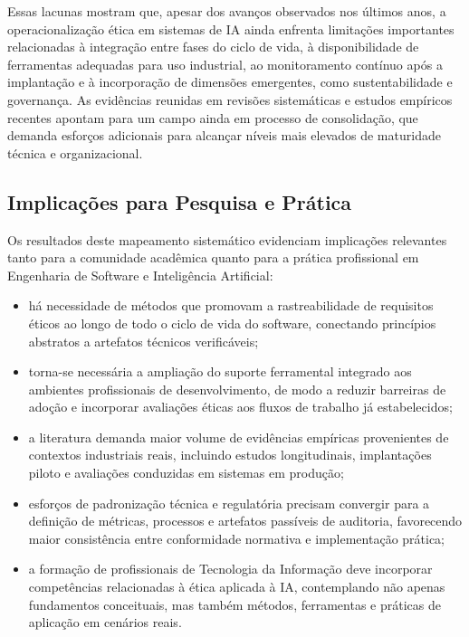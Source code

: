 Essas lacunas mostram que, apesar dos avanços observados nos últimos anos, a operacionalização ética em sistemas de IA ainda enfrenta limitações importantes relacionadas à integração entre fases do ciclo de vida, à disponibilidade de ferramentas adequadas para uso industrial, ao monitoramento contínuo após a implantação e à incorporação de dimensões emergentes, como sustentabilidade e governança. As evidências reunidas em revisões sistemáticas e estudos empíricos recentes \cite{S022, S058, S053} apontam para um campo ainda em processo de consolidação, que demanda esforços adicionais para alcançar níveis mais elevados de maturidade técnica e organizacional.

\subsection{Implicações para Pesquisa e Prática}

Os resultados deste mapeamento sistemático evidenciam implicações relevantes tanto para a comunidade acadêmica quanto para a prática profissional em Engenharia de Software e Inteligência Artificial:

\begin{itemize}
    \item há necessidade de métodos que promovam a rastreabilidade de requisitos éticos ao longo de todo o ciclo de vida do software, conectando princípios abstratos a artefatos técnicos verificáveis;
    \item torna-se necessária a ampliação do suporte ferramental integrado aos ambientes profissionais de desenvolvimento, de modo a reduzir barreiras de adoção e incorporar avaliações éticas aos fluxos de trabalho já estabelecidos;
    \item a literatura demanda maior volume de evidências empíricas provenientes de contextos industriais reais, incluindo estudos longitudinais, implantações piloto e avaliações conduzidas em sistemas em produção;
    \item esforços de padronização técnica e regulatória precisam convergir para a definição de métricas, processos e artefatos passíveis de auditoria, favorecendo maior consistência entre conformidade normativa e implementação prática;
    \item a formação de profissionais de Tecnologia da Informação deve incorporar competências relacionadas à ética aplicada à IA, contemplando não apenas fundamentos conceituais, mas também métodos, ferramentas e práticas de aplicação em cenários reais.
\end{itemize}

